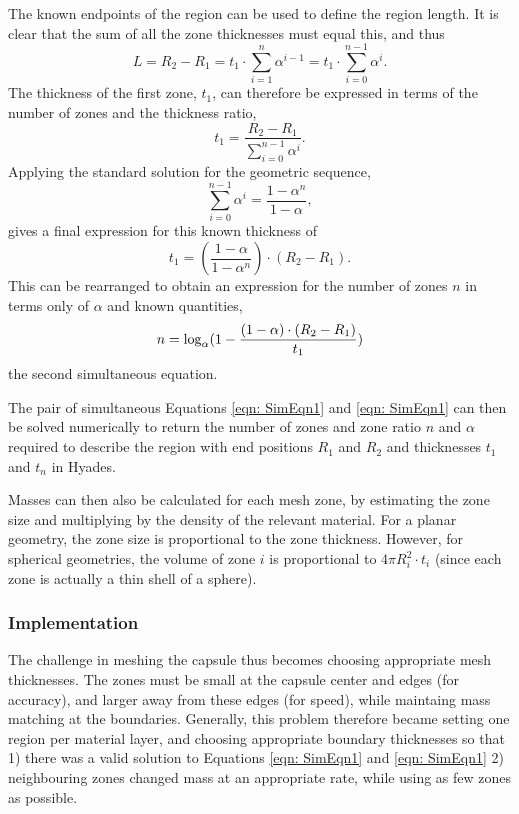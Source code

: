 The known endpoints of the region can be used to define the region length. It is clear that the sum of all the zone thicknesses must equal this, and thus
\begin{equation}{L = R_2 - R_1 = t_1 \cdot \sum_{i=1}^{n} \alpha^{i-1} = t_1 \cdot \sum_{i=0}^{n-1} \alpha^{i}.}\end{equation}
The thickness of the first zone, $t_1$, can therefore be expressed in terms of the number of zones and the thickness ratio,
\begin{equation}{t_1  = \frac{R_2 - R_1}{\sum_{i=0}^{n-1} \alpha^{i}}.}\end{equation}
Applying the standard solution for the geometric sequence, 
\begin{equation}{{\sum_{i=0}^{n-1} \alpha^{i}} = \frac{1 - \alpha^n}{1 - \alpha},}\end{equation}
gives a final expression for this known thickness of 
\begin{equation}{t_1  = ( \frac{1 - \alpha}{1 - \alpha^n} )\cdot (R_2 - R_1).}\end{equation}
This can be rearranged to obtain an expression for the number of zones $n$ in terms only of $\alpha$ and known quantities,
\begin{equation}{\label{eqn: SimEqn2} n  =  \log_{\alpha} (1 - \frac{ (1-\alpha) \cdot(R_2 - R_1)}{t_1} )}\end{equation}
the second simultaneous equation.

The pair of simultaneous Equations \ref{eqn: SimEqn1} and \ref{eqn: SimEqn1} can then be solved numerically to return the number of zones and zone ratio $n$ and $\alpha$ required to describe the region with end positions $R_1$ and $R_2$ and thicknesses $t_1$ and $t_n$ in Hyades.

Masses can then also be calculated for each mesh zone, by estimating the zone size and multiplying by the density of the relevant material. For a planar geometry, the zone size is proportional to the zone thickness. However, for spherical geometries, the volume of zone $i$ is proportional to $4 \pi R_i^2 \cdot t_i$ (since each zone is actually a thin shell of a sphere).

\subsubsection{Implementation}
The challenge in meshing the capsule thus becomes choosing appropriate mesh thicknesses. The zones must be small at the capsule center and edges (for accuracy), and larger away from these edges (for speed), while maintaing mass matching at the boundaries. Generally, this problem therefore became setting one region per material layer, and choosing appropriate boundary thicknesses so that 1) there was a valid solution to Equations \ref{eqn: SimEqn1} and \ref{eqn: SimEqn1} 2) neighbouring zones changed mass at an appropriate rate, while using as few zones as possible.


